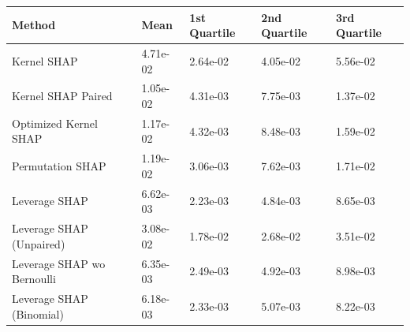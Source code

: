 \begin{tabular}{lllll}
  \toprule
  \textbf{Method} & \textbf{Mean} & \textbf{1st Quartile} & \textbf{2nd Quartile} & \textbf{3rd Quartile} \\ \midrule
Kernel SHAP & 4.71e-02 & 2.64e-02 & 4.05e-02 & 5.56e-02\\
Kernel SHAP Paired & 1.05e-02 & 4.31e-03 & 7.75e-03 & 1.37e-02\\
Optimized Kernel SHAP & 1.17e-02 & 4.32e-03 & 8.48e-03 & 1.59e-02\\
Permutation SHAP & 1.19e-02 & 3.06e-03 & 7.62e-03 & 1.71e-02\\
Leverage SHAP & \cellcolor{bronze!60}6.62e-03 & \cellcolor{gold!60}2.23e-03 & \cellcolor{gold!60}4.84e-03 & \cellcolor{silver!60}8.65e-03\\
Leverage SHAP (Unpaired) & 3.08e-02 & 1.78e-02 & 2.68e-02 & 3.51e-02\\
Leverage SHAP wo Bernoulli & \cellcolor{silver!60}6.35e-03 & \cellcolor{bronze!60}2.49e-03 & \cellcolor{silver!60}4.92e-03 & \cellcolor{bronze!60}8.98e-03\\
Leverage SHAP (Binomial) & \cellcolor{gold!60}6.18e-03 & \cellcolor{silver!60}2.33e-03 & \cellcolor{bronze!60}5.07e-03 & \cellcolor{gold!60}8.22e-03\\
\bottomrule
\end{tabular}
